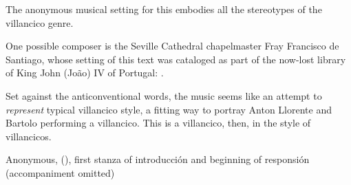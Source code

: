
The anonymous musical setting for this embodies all the stereotypes of the
villancico genre.%
\begin{Footnote}
    One possible composer is the Seville Cathedral chapelmaster Fray Francisco
    de Santiago, whose setting of this text was cataloged as part of the
    now-lost library of King John (João) IV of Portugal:
    \autocite[caixão 26, ]{JohnIV:Catalog}.
\end{Footnote}
Set against the anticonventional words, the music seems like an attempt to
\emph{represent} typical villancico style, a fitting way to portray Anton
Llorente and Bartolo performing a villancico.
This is a villancico, then, in the style of villancicos.


{Anonymous,  (), first
stanza of introducción and beginning of responsión (accompaniment omitted)}

